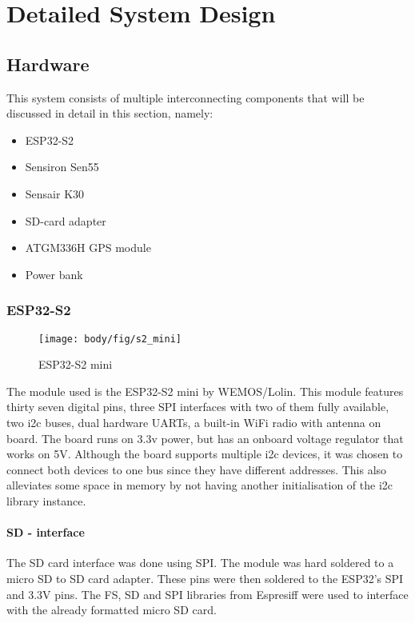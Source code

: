 \chapter{Detailed System Design}
\vspace{-2em}
\section{Hardware}


This system consists of multiple interconnecting components that will be discussed in detail in this section, namely:
\begin{itemize}
	\item ESP32-S2
	\item Sensiron Sen55
	\item Sensair K30
	\item SD-card adapter
	\item ATGM336H GPS module
	\item Power bank	
\end{itemize} 




\subsection{ESP32-S2}

\begin{figure}[!htb]
	\centering
	\texttt{[image: body/fig/s2\_mini]}
	\caption{ESP32-S2 mini}
	\label{fig:s2mini}
\end{figure}


\noindent
The module used is the ESP32-S2 mini by WEMOS/Lolin. This module features thirty seven digital pins, three SPI interfaces with two of them fully available, two i2c buses, dual hardware UARTs, a built-in WiFi radio with antenna on board. The board runs on 3.3v power, but has an onboard voltage regulator that works on 5V\cite{wemos2021s2mini}. Although the board supports multiple i2c devices, it was chosen to connect both devices to one bus since they have different addresses. This also alleviates some space in memory by not having another initialisation of the i2c library instance.
\subsubsection{SD - interface}
The SD card interface was done using SPI. The module was hard soldered to a micro SD to SD card adapter. These pins were then soldered to the ESP32's SPI and 3.3V pins.
The FS, SD and SPI libraries from Espresiff were used to interface with the already formatted micro SD card.




